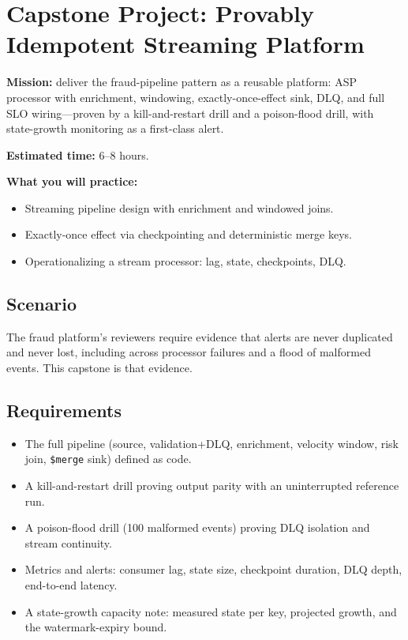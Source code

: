 \section{Capstone Project: Provably Idempotent Streaming Platform}\label{sec:ch15-capstone}

\begin{capstonebox}
\textbf{Mission:} deliver the fraud-pipeline pattern as a reusable platform: ASP processor with enrichment, windowing, exactly-once-effect sink, DLQ, and full SLO wiring---proven by a kill-and-restart drill and a poison-flood drill, with state-growth monitoring as a first-class alert.

\textbf{Estimated time:} 6--8 hours.

\textbf{What you will practice:}
\begin{itemize}
    \item Streaming pipeline design with enrichment and windowed joins.
    \item Exactly-once effect via checkpointing and deterministic merge keys.
    \item Operationalizing a stream processor: lag, state, checkpoints, DLQ.
\end{itemize}
\end{capstonebox}

\subsection*{Scenario}
The fraud platform's reviewers require evidence that alerts are never duplicated and never lost, including across processor failures and a flood of malformed events. This capstone is that evidence.

\subsection*{Requirements}
\begin{itemize}
    \item The full pipeline (source, validation+DLQ, enrichment, velocity window, risk join, \texttt{\$merge} sink) defined as code.
    \item A kill-and-restart drill proving output parity with an uninterrupted reference run.
    \item A poison-flood drill (100 malformed events) proving DLQ isolation and stream continuity.
    \item Metrics and alerts: consumer lag, state size, checkpoint duration, DLQ depth, end-to-end latency.
    \item A state-growth capacity note: measured state per key, projected growth, and the watermark-expiry bound.
\end{itemize}

